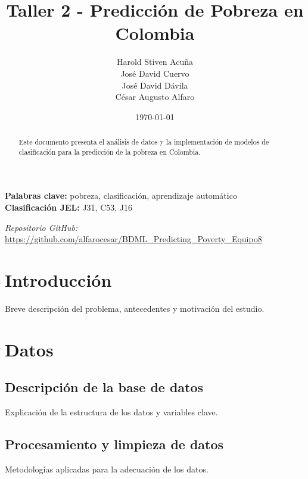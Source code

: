 \documentclass[12pt,a4paper,onecolumn]{article}
\title{\textbf{Taller 2 - Predicción de Pobreza en Colombia}}
\author{%
\begin{center}
Harold Stiven Acuña\\
José David Cuervo\\
José David Dávila\\
César Augusto Alfaro
\end{center}%
}
\date{\today}
\begin{document}
\maketitle
\thispagestyle{empty}


\begin{abstract}
Este documento presenta el análisis de datos y la implementación de modelos de clasificación para la predicción de la pobreza en Colombia.
\end{abstract}

\medskip

\begin{flushleft}
    {\bf Palabras clave:} pobreza, clasificación, aprendizaje automático \\
    {\bf Clasificación JEL:} J31, C53, J16
\end{flushleft}

\begin{center}
    \textit{Repositorio GitHub:} \url{https://github.com/alfarocesar/BDML_Predicting_Poverty_Equipo8}
\end{center}

\pagebreak
\doublespacing


\section{Introducción}
Breve descripción del problema, antecedentes y motivación del estudio.

\section{Datos}
\subsection{Descripción de la base de datos}
Explicación de la estructura de los datos y variables clave.

\subsection{Procesamiento y limpieza de datos}
Metodologías aplicadas para la adecuación de los datos.
\end{document}
